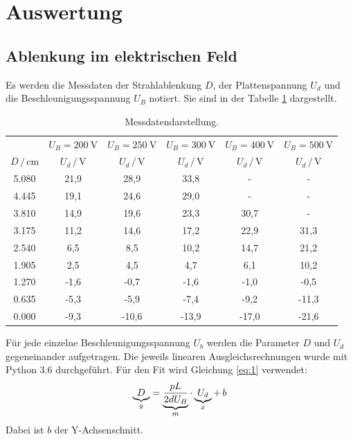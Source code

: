 \section{Auswertung}
\subsection{Ablenkung im elektrischen Feld}
Es werden die Messdaten der Strahlablenkung $D$, der Plattenspannung $U_d$ und die Beschleunigungsspannung $U_B$ notiert.
Sie sind in der Tabelle \ref{tab:1} dargestellt.
\begin{table}[H]
  \centering
  \caption{Messdatendarstellung.}
  \label{tab:1}
  \begin{tabular}{c c c c c c}
\toprule
& \multicolumn{1}{c}{$U_B=\SI{200}{\volt}$} & \multicolumn{1}{c}{$U_B=\SI{250}{\volt}$} &\multicolumn{1}{c}{$U_B=\SI{300}{\volt}$}&\multicolumn{1}{c}{$U_B=\SI{400}{\volt}$}&\multicolumn{1}{c}{$U_B=\SI{500}{\volt}$}\\
\cmidrule(lr){2-2}\cmidrule(lr){3-3}\cmidrule(lr){4-4}\cmidrule(lr){5-5}\cmidrule(lr){6-6}
$D \, / \, \si{\centi\meter}$ & $U_d \, / \, \si{\volt}$ & $U_d \, / \, \si{\volt}$ & $U_d \, / \, \si{\volt}$ &$U_d \, / \, \si{\volt}$ & $U_d \, / \, \si{\volt}$\\
\midrule
5.080 & 21,9  & 28,9  & 33,8  & -    & -   \\
4.445 & 19,1  & 24,6  & 29,0  & -    & -   \\
3.810 & 14,9  & 19,6  & 23,3  & 30,7 & -   \\
3.175 & 11,2  & 14,6  & 17,2  & 22,9 & 31,3\\
2.540 &  6,5  &  8,5  & 10,2  & 14,7 & 21,2\\
1.905 &  2,5  &  4,5  &  4,7  &  6,1 & 10,2\\
1.270 & -1,6  & -0,7  & -1,6  & -1,0 & -0,5\\
0.635 & -5,3  & -5,9  & -7,4  & -9,2 &-11,3\\
0.000 & -9,3  &-10,6  &-13,9  &-17,0 &-21,6\\
\bottomrule
  \end{tabular}
\end{table}
Für jede einzelne Beschleunigungsspannung $U_b$ werden die
Parameter $D$ und $U_d$ gegeneinander aufgetragen.
Die jeweils linearen Ausgleichsrechnungen wurde mit Python 3.6 durchgeführt.
Für den Fit wird Gleichung \ref{eq:1} verwendet:
\begin{equation*}
  \underbrace{D}_{\mathclap{y}} = \underbrace{\frac{pL}{2dU_B}}_{\mathclap{m}} \cdot \underbrace{U_d}_{\mathclap{x}} + \, b
\end{equation*}
Dabei ist $b$ der Y-Achsenschnitt.

